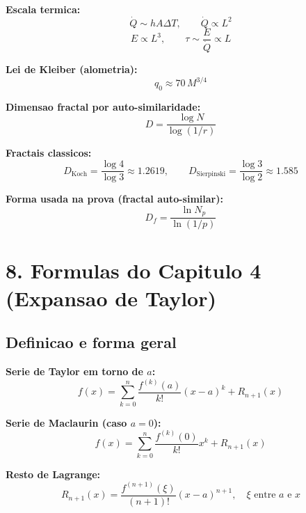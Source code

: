 \documentclass[12pt,a4paper]{article}
\begin{document}
\textbf{Escala termica:}
\begin{equation}
\dot{Q}\sim hA\Delta T,\qquad \dot{Q}\propto L^2
\end{equation}
\begin{equation}
E\propto L^3,
\qquad
\tau\sim\frac{E}{\dot{Q}}\propto L
\end{equation}

\textbf{Lei de Kleiber (alometria):}
\begin{equation}
q_0 \approx 70\,M^{3/4}
\end{equation}

\textbf{Dimensao fractal por auto-similaridade:}
\begin{equation}
D = \frac{\log N}{\log(1/r)}
\end{equation}

\textbf{Fractais classicos:}
\begin{equation}
D_{\text{Koch}} = \frac{\log 4}{\log 3} \approx 1.2619,
\qquad
D_{\text{Sierpinski}} = \frac{\log 3}{\log 2} \approx 1.585
\end{equation}

\textbf{Forma usada na prova (fractal auto-similar):}
\begin{equation}
D_f = \frac{\ln N_p}{\ln(1/p)}
\end{equation}

\section*{8. Formulas do Capitulo 4 (Expansao de Taylor)}

\subsection*{Definicao e forma geral}

\textbf{Serie de Taylor em torno de $a$:}
\begin{equation}
f(x) = \sum_{k=0}^{n} \frac{f^{(k)}(a)}{k!}(x-a)^k + R_{n+1}(x)
\end{equation}

\textbf{Serie de Maclaurin (caso $a=0$):}
\begin{equation}
f(x) = \sum_{k=0}^{n} \frac{f^{(k)}(0)}{k!}x^k + R_{n+1}(x)
\end{equation}

\textbf{Resto de Lagrange:}
\begin{equation}
R_{n+1}(x) = \frac{f^{(n+1)}(\xi)}{(n+1)!}(x-a)^{n+1}, \quad \xi \text{ entre } a \text{ e } x
\end{equation}
\end{document}
